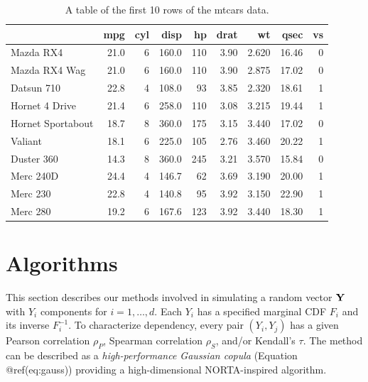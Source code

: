 \documentclass[
]{jss}
\begin{document}
\begin{CodeChunk}
\begin{table}

\caption{\label{tab:tab:compare-table}A table of the first 10 rows of the mtcars data.}
\centering
\begin{tabular}[t]{lrrrrrrrr}
\toprule
  & mpg & cyl & disp & hp & drat & wt & qsec & vs\\
\midrule
Mazda RX4 & 21.0 & 6 & 160.0 & 110 & 3.90 & 2.620 & 16.46 & 0\\
Mazda RX4 Wag & 21.0 & 6 & 160.0 & 110 & 3.90 & 2.875 & 17.02 & 0\\
Datsun 710 & 22.8 & 4 & 108.0 & 93 & 3.85 & 2.320 & 18.61 & 1\\
\addlinespace
Hornet 4 Drive & 21.4 & 6 & 258.0 & 110 & 3.08 & 3.215 & 19.44 & 1\\
Hornet Sportabout & 18.7 & 8 & 360.0 & 175 & 3.15 & 3.440 & 17.02 & 0\\
Valiant & 18.1 & 6 & 225.0 & 105 & 2.76 & 3.460 & 20.22 & 1\\
\addlinespace
Duster 360 & 14.3 & 8 & 360.0 & 245 & 3.21 & 3.570 & 15.84 & 0\\
Merc 240D & 24.4 & 4 & 146.7 & 62 & 3.69 & 3.190 & 20.00 & 1\\
Merc 230 & 22.8 & 4 & 140.8 & 95 & 3.92 & 3.150 & 22.90 & 1\\
\addlinespace
Merc 280 & 19.2 & 6 & 167.6 & 123 & 3.92 & 3.440 & 18.30 & 1\\
\bottomrule
\end{tabular}
\end{table}

\end{CodeChunk}

\hypertarget{algorithms}{%
\section{Algorithms}\label{algorithms}}

This section describes our methods involved in simulating a random
vector \(\bf Y\) with \(Y_i\) components for \(i=1,\ldots,d\). Each
\(Y_i\) has a specified marginal CDF \(F_i\) and its inverse
\(F^{-1}_i\). To characterize dependency, every pair \((Y_i, Y_j)\) has
a given Pearson correlation \(\rho_P\), Spearman correlation \(\rho_S\),
and/or Kendall's \(\tau\). The method can be described as a
\emph{high-performance Gaussian copula} (Equation @ref(eq:gauss))
providing a high-dimensional NORTA-inspired algorithm.
\end{document}
